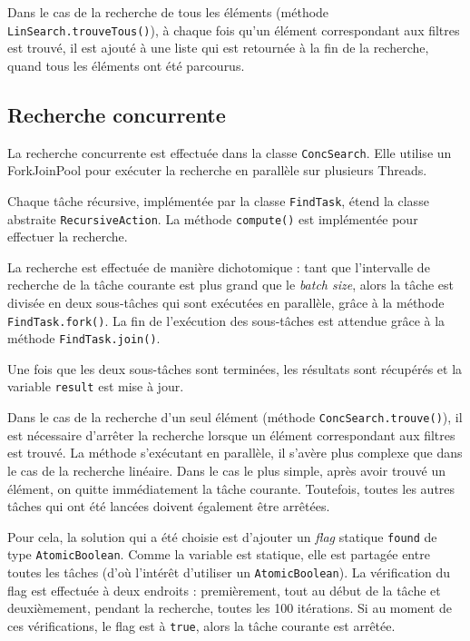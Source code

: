 \documentclass[
  french,
  a4paper,
]{scrartcl}
\begin{document}
Dans le cas de la recherche de tous les éléments (méthode \lstinline|LinSearch.trouveTous()|),
à chaque fois qu'un élément correspondant aux filtres est trouvé, il est ajouté à
une liste qui est retournée à la fin de la recherche, quand tous les éléments ont été
parcourus.

\subsection{Recherche concurrente}

La recherche concurrente est effectuée dans la classe \lstinline|ConcSearch|.
Elle utilise un ForkJoinPool pour exécuter la recherche en parallèle sur plusieurs Threads.

Chaque tâche récursive, implémentée par la classe \lstinline|FindTask|, étend la 
classe abstraite \lstinline|RecursiveAction|. La méthode \lstinline|compute()| est 
implémentée pour effectuer la recherche. 

La recherche est effectuée de manière dichotomique : tant que l'intervalle de recherche 
de la tâche courante est plus grand que le \textit{batch size}, alors la tâche 
est divisée en deux sous-tâches qui sont exécutées en parallèle, grâce 
à la méthode \lstinline{FindTask.fork()}. La fin de l'exécution des sous-tâches 
est attendue grâce à la méthode \lstinline{FindTask.join()}.

Une fois que les deux sous-tâches sont terminées, les résultats sont récupérés 
et la variable \lstinline|result| est mise à jour. 

Dans le cas de la recherche d'un seul élément (méthode \lstinline|ConcSearch.trouve()|),
il est nécessaire d'arrêter la recherche lorsque un élément correspondant aux filtres
est trouvé. La méthode s'exécutant en parallèle, il s'avère plus complexe que 
dans le cas de la recherche linéaire. Dans le cas le plus simple, 
après avoir trouvé un élément, on quitte immédiatement la tâche courante. 
Toutefois, toutes les autres tâches qui ont été lancées doivent également être 
arrêtées.

Pour cela, la solution qui a été choisie est d'ajouter un \textit{flag} statique \lstinline|found|
de type \lstinline|AtomicBoolean|. Comme la variable est statique, elle est partagée
entre toutes les tâches (d'où l'intérêt d'utiliser un \lstinline|AtomicBoolean|).
La vérification du flag est effectuée à deux endroits : premièrement, tout au début de
 la tâche et deuxièmement, pendant la recherche, toutes les 
100 itérations. 
Si au moment de ces vérifications, le flag est à \lstinline|true|, alors la tâche 
courante est arrêtée.
\end{document}
